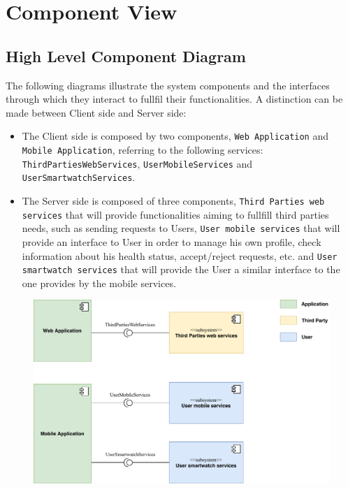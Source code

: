 \documentclass[12pt,a4paper]{article}
\begin{document}
\section{Component View}
	\subsection{High Level Component Diagram}	
		The following diagrams illustrate the system components and the interfaces through which they interact to fullfil their functionalities. A distinction can be made between Client side and Server side:
		\begin{itemize}
			\item The Client side is composed by two components, \texttt{Web Application} and \texttt{Mobile Application},  referring to the following services:\\
			\texttt{ThirdPartiesWebServices}, \texttt{UserMobileServices} and \texttt{UserSmartwatchServices}. 
			
			\item The Server side is composed of three components, \texttt{Third Parties web services} that will provide functionalities aiming to fullfill third parties needs, such as sending requests to Users, \texttt{User mobile services} that will provide an interface to User in order to manage his own profile, check information about his health status, accept/reject requests, etc. and \texttt{User smartwatch services} that will provide the User a similar interface to the one provides by the mobile services.
		\end{itemize}
		
		\begin{figure}[h]
			\centering
			\includegraphics[width=1.0\linewidth]{images/high_lvl_comp_diag}
			\label{fig:highlvlcompdiag}
		\end{figure}
\end{document}
